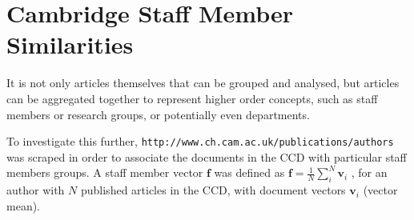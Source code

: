 \section{Cambridge Staff Member Similarities}
\label{sec:AUTHORCLUSTERS}

It is not only articles themselves that can be grouped and analysed, but articles can be aggregated together to represent higher order concepts, such as staff members or research groups, or potentially even departments. 

To investigate this further, \texttt{http://www.ch.cam.ac.uk/publications/authors} was scraped in order to associate the documents in the CCD with particular staff members groups. A staff member vector $\textbf{f}$ was defined as $\mathbf{f}=\frac{1}{N}\sum_{i}^{N} \mathbf{v}_i$ , for an author with $N$ published articles in the CCD, with document vectors $\mathbf{v}_i$ (vector mean).


